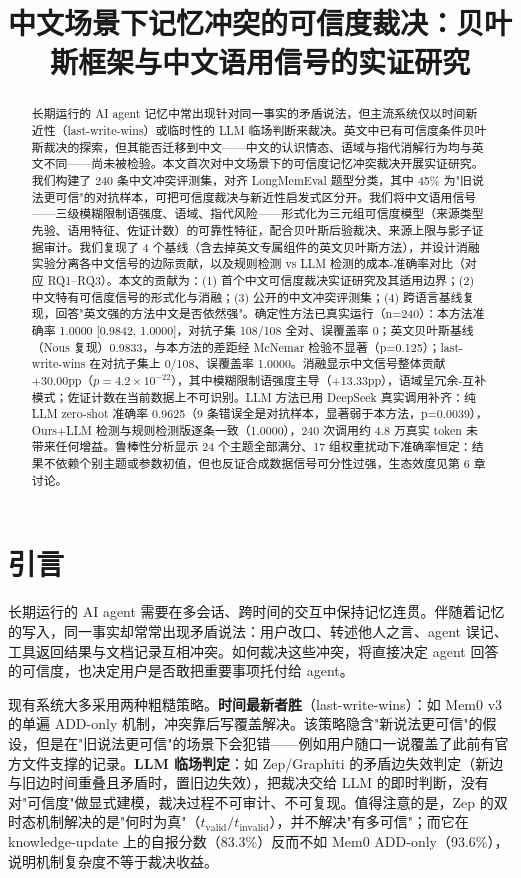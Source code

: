 \documentclass{article}
\title{中文场景下记忆冲突的可信度裁决：贝叶斯框架与中文语用信号的实证研究}
\author{}  %
\begin{document}
\maketitle

\begin{abstract}
长期运行的 AI agent 记忆中常出现针对同一事实的矛盾说法，但主流系统仅以时间新近性（last-write-wins）或临时性的 LLM 临场判断来裁决。英文中已有可信度条件贝叶斯裁决的探索\citep{singh2026}，但其能否迁移到中文——中文的认识情态、语域与指代消解行为均与英文不同——尚未被检验。本文首次对中文场景下的可信度记忆冲突裁决开展实证研究。我们构建了 240 条中文冲突评测集，对齐 LongMemEval 题型分类，其中 45\% 为"旧说法更可信"的对抗样本，可把可信度裁决与新近性启发式区分开。我们将中文语用信号——三级模糊限制语强度、语域、指代风险——形式化为三元组可信度模型（来源类型先验、语用特征、佐证计数）的可靠性特征，配合贝叶斯后验裁决、来源上限与影子证据审计。我们复现了 4 个基线（含去掉英文专属组件的英文贝叶斯方法），并设计消融实验分离各中文信号的边际贡献，以及规则检测 vs LLM 检测的成本-准确率对比（对应 RQ1–RQ3）。本文的贡献为：(1) 首个中文可信度裁决实证研究及其适用边界；(2) 中文特有可信度信号的形式化与消融；(3) 公开的中文冲突评测集；(4) 跨语言基线复现，回答"英文强的方法中文是否依然强"。确定性方法已真实运行（n=240）：本方法准确率 1.0000 [0.9842, 1.0000]，对抗子集 108/108 全对、误覆盖率 0；英文贝叶斯基线（Nous 复现）0.9833，与本方法的差距经 McNemar 检验不显著（p=0.125）；last-write-wins 在对抗子集上 0/108、误覆盖率 1.0000。消融显示中文信号整体贡献 +30.00pp（$p=4.2\times 10^{-22}$），其中模糊限制语强度主导（+13.33pp），语域呈冗余-互补模式；佐证计数在当前数据上不可识别。LLM 方法已用 DeepSeek 真实调用补齐：纯 LLM zero-shot 准确率 0.9625（9 条错误全是对抗样本，显著弱于本方法，p=0.0039），Ours+LLM 检测与规则检测版逐条一致（1.0000），240 次调用约 4.8 万真实 token 未带来任何增益。鲁棒性分析显示 24 个主题全部满分、17 组权重扰动下准确率恒定：结果不依赖个别主题或参数初值，但也反证合成数据信号可分性过强，生态效度见第 6 章讨论。
\end{abstract}

\section{引言}

长期运行的 AI agent 需要在多会话、跨时间的交互中保持记忆连贯。伴随着记忆的写入，同一事实却常常出现矛盾说法：用户改口、转述他人之言、agent 误记、工具返回结果与文档记录互相冲突。如何裁决这些冲突，将直接决定 agent 回答的可信度，也决定用户是否敢把重要事项托付给 agent。


现有系统大多采用两种粗糙策略。\textbf{时间最新者胜}（last-write-wins）：如 Mem0 v3 的单遍 ADD-only 机制，冲突靠后写覆盖解决。该策略隐含"新说法更可信"的假设，但是在"旧说法更可信"的场景下会犯错——例如用户随口一说覆盖了此前有官方文件支撑的记录。\textbf{LLM 临场判定}：如 Zep/Graphiti 的矛盾边失效判定（新边与旧边时间重叠且矛盾时，置旧边失效），把裁决交给 LLM 的即时判断，没有对"可信度"做显式建模，裁决过程不可审计、不可复现。值得注意的是，Zep 的双时态机制解决的是"何时为真"（$t_{\mathrm{valid}}/t_{\mathrm{invalid}}$），并不解决"有多可信"；而它在 knowledge-update 上的自报分数（83.3\%）反而不如 Mem0 ADD-only（93.6\%），说明机制复杂度不等于裁决收益。
\end{document}
